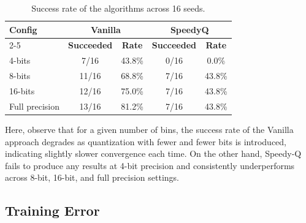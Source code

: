 \documentclass[10pt,conference,compsocconf]{IEEEtran}
\begin{document}
        \begin{table}[h]
        \centering
        \begin{tabular}{|l|cc|cc|}
        \hline
        \multirow{2}{*}{\textbf{Config}} & \multicolumn{2}{c|}{\textbf{Vanilla}} & \multicolumn{2}{c|}{\textbf{SpeedyQ}} \\ \cline{2-5}
                                         & \multicolumn{1}{c|}{\textbf{Succeeded}} & \textbf{Rate} & \multicolumn{1}{c|}{\textbf{Succeeded}} & \textbf{Rate} \\ \hline
        4-bits                            & \multicolumn{1}{c|}{7/16}  & 43.8\% & \multicolumn{1}{c|}{0/16} &  0.0\% \\ \hline
        8-bits                            & \multicolumn{1}{c|}{11/16} & 68.8\% & \multicolumn{1}{c|}{7/16} & 43.8\% \\ \hline
        16-bits                           & \multicolumn{1}{c|}{12/16} & 75.0\% & \multicolumn{1}{c|}{7/16} & 43.8\% \\ \hline
        Full precision                   & \multicolumn{1}{c|}{13/16} & 81.2\% & \multicolumn{1}{c|}{7/16} & 43.8\% \\ \hline
        \end{tabular}
        \caption{Success rate of the algorithms across 16 seeds.}
        \label{tab:cartpole_success_rate}
        \end{table}
        
        Here, observe that for a given number of bins, the success rate of the Vanilla approach degrades as quantization with fewer and fewer bits is introduced, indicating slightly slower convergence each time. On the other hand, Speedy-Q fails to produce any results at 4-bit precision and consistently underperforms across 8-bit, 16-bit, and full precision settings.

         \subsection{Training Error}
\end{document}
